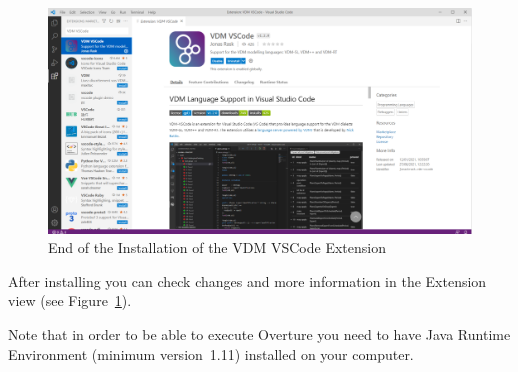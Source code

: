 \documentclass{overturerepchap}
\newcommand{\url}[1]{\texttt{#1}}
\begin{document}
\begin{figure}[!htb]
\begin{center}
\includegraphics[width=1\textwidth]{snapshots/End of the installation of the VDM VSCode Extension.png}
\caption{End of the Installation of the VDM VSCode Extension\label{fig:EndofInstalation}}
\end{center}
\end{figure}

After installing you can check changes and more information in the Extension view (see
Figure~\ref{fig:EndofInstalation}).


\newpage
Note that in order to be able
to execute Overture you need to have Java Runtime Environment (minimum
version~1.11) installed on your computer.





\end{document}

